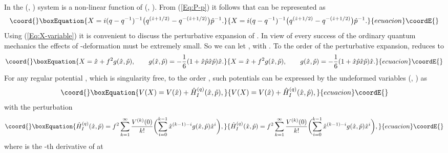 \documentclass[a4paper,12pt]{article}
\begin{document}
In the  (\coordHE{}, \coordHE{}) system  \coordHE{} is a non-linear function of
 (\coordHE{}, \coordHE{}).
From (\ref{Eq:P-p}) it follows that \coordHE{} can be represented as
\begin{equation}\coord{}\boxEquation{
\label{Eq:X-variable}
X=i(q-q^{-1})^{-1} \bigl( q^{(\hat z+1/2)} -
q^{-(\hat z+1/2)}\bigr)\hat p^{-1}. 
}{
X=i(q-q^{-1})^{-1} \bigl( q^{(\hat z+1/2)} -
q^{-(\hat z+1/2)}\bigr)\hat p^{-1}. 
}{ecuacion}\coordE{}\end{equation}
Using (\ref{Eq:X-variable}) it is convenient to discuss the perturbative 
expansion of \coordHE{}.
In view of every success of the ordinary quantum mechanics the effects of
\coordHE{}-deformation must be extremely small. So we can  let \coordHE{}, 
with \coordHE{}. To the order \coordHE{} of the perturbative expansion,  \coordHE{} 
reduces to 
\begin{equation}\coord{}\boxEquation{
\label{Eq:X-perturbative}
X=\hat x  + f^2 g(\hat x, \hat p), \qquad
g(\hat x,\hat p)=-\frac{1}{6}(1+
\hat x  \hat p  \hat x  \hat p )\hat x.
}{
X=\hat x  + f^2 g(\hat x, \hat p), \qquad
g(\hat x,\hat p)=-\frac{1}{6}(1+
\hat x  \hat p  \hat x  \hat p )\hat x.
}{ecuacion}\coordE{}\end{equation} 
For any regular potential \coordHE{}, which is singularity free, to the 
order \coordHE{},  such potentials can be expressed by the 
undeformed variables (\coordHE{}, \coordHE{}) as
\begin{equation}\coord{}\boxEquation{
\label{Eq:q-potential}
V(X)=V(\hat x) +\hat H^{(q)}_I(\hat x,\hat p),
}{
V(X)=V(\hat x) +\hat H^{(q)}_I(\hat x,\hat p),
}{ecuacion}\coordE{}\end{equation}
with the perturbation
\begin{equation}\coord{}\boxEquation{
\label{Eq:H-q}
\hat H^{(q)}_I(\hat x,\hat p)=f^2\sum_{k=1}^\infty \frac{V^{(k)}(0)}{k!}
\biggl( \sum_{i=0}^{k-1}\hat x^{(k-1)-i}g(\hat x,\hat p)\hat x^{i}\biggr), 
}{
\hat H^{(q)}_I(\hat x,\hat p)=f^2\sum_{k=1}^\infty \frac{V^{(k)}(0)}{k!}
\biggl( \sum_{i=0}^{k-1}\hat x^{(k-1)-i}g(\hat x,\hat p)\hat x^{i}\biggr), 
}{ecuacion}\coordE{}\end{equation}
where \coordHE{} is the \coordHE{}-th derivative of \coordHE{} at \coordHE{} 
\end{document}
